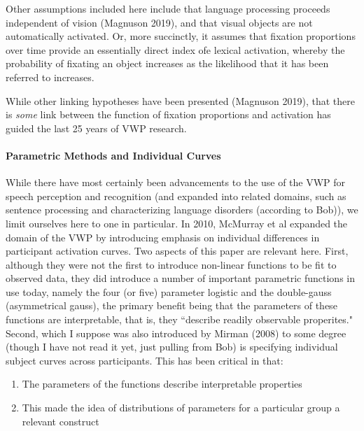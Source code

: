 \documentclass{article}
\begin{document}
Other assumptions included here include that language processing proceeds independent of vision (Magnuson 2019), and that visual objects are not automatically activated. Or, more succinctly, it assumes that fixation proportions over time provide an essentially direct index ofe lexical activation, whereby the probability of fixating an object increases as the likelihood that it has been referred to increases.


While other linking hypotheses have been presented (Magnuson 2019), that there is \textit{some} link between the function of fixation proportions and activation has guided the last 25 years of VWP research.



\paragraph{Parametric Methods and Individual Curves} While there have most certainly been advancements to the use of the VWP for speech perception and recognition (and expanded into related domains, such as sentence processing and characterizing language disorders (according to Bob)), we  limit ourselves here to one in particular. In 2010, McMurray et al expanded the domain of the VWP by introducing emphasis on individual differences in participant activation curves. Two aspects of this paper are relevant here. First, although they were not the first to introduce non-linear functions to be fit to observed data, they did introduce a number of important parametric functions in use today, namely the four (or five) parameter logistic and the double-gauss (asymmetrical gauss), the primary benefit being that the parameters of these functions are interpretable, that is, they ``describe readily observable properites." Second, which I suppose was also introduced by Mirman (2008) to some degree (though I have not read it yet, just pulling from Bob) is specifying individual subject curves across participants. This has been critical in that:

\begin{singlespace}
\begin{enumerate}
\vspace{-3mm}
\item The parameters of the functions describe interpretable properties
\item This made the idea of distributions of parameters for a particular group a relevant construct
\end{enumerate}
\end{singlespace}
\end{document}
